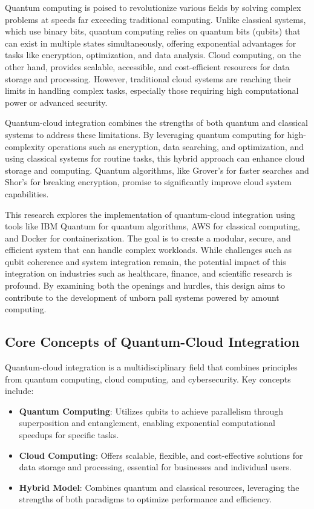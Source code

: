\documentclass[12pt,a4paper]{article}
\begin{document}
    Quantum computing is poised to revolutionize various fields by solving complex problems at speeds far exceeding traditional computing. Unlike classical systems, which use binary bits, quantum computing relies on quantum bits (qubits) that can exist in multiple states simultaneously, offering exponential advantages for tasks like encryption, optimization, and data analysis. Cloud computing, on the other hand, provides scalable, accessible, and cost-efficient resources for data storage and processing. However, traditional cloud systems are reaching their limits in handling complex tasks, especially those requiring high computational power or advanced security.

    Quantum-cloud integration combines the strengths of both quantum and classical systems to address these limitations. By leveraging quantum computing for high-complexity operations such as encryption, data searching, and optimization, and using classical systems for routine tasks, this hybrid approach can enhance cloud storage and computing. Quantum algorithms, like Grover’s for faster searches and Shor’s for breaking encryption, promise to significantly improve cloud system capabilities.
    
    This research explores the implementation of quantum-cloud integration using tools like IBM Quantum for quantum algorithms, AWS for classical computing, and Docker for containerization. The goal is to create a modular, secure, and efficient system that can handle complex workloads. While challenges such as qubit coherence and system integration remain, the potential impact of this integration on industries such as healthcare, finance, and scientific research is profound. By examining both the openings and hurdles, this design aims to contribute to the development of unborn pall systems powered by amount computing.
    
\subsection{Core Concepts of Quantum-Cloud Integration}
Quantum-cloud integration is a multidisciplinary field that combines principles from quantum computing, cloud computing, and cybersecurity. Key concepts include:

\begin{itemize}
    \item \textbf{Quantum Computing}: Utilizes qubits to achieve parallelism through superposition and entanglement, enabling exponential computational speedups for specific tasks.
    \item \textbf{Cloud Computing}: Offers scalable, flexible, and cost-effective solutions for data storage and processing, essential for businesses and individual users.
    \item \textbf{Hybrid Model}: Combines quantum and classical resources, leveraging the strengths of both paradigms to optimize performance and efficiency.
\end{itemize}
\end{document}
